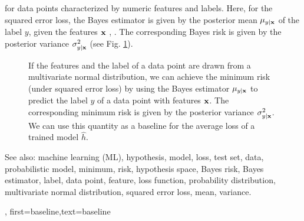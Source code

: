{{for data points characterized by numeric features and labels.
Here, for the squared error loss, the Bayes estimator is given by the posterior 
mean $\mu_{y|{\bf x}}$ of the label $y$, given the 
features ${\bf x}$ \cite{LC}, \cite{GrayProbBook}. The corresponding Bayes risk 
is given by the posterior variance 
$\sigma^{2}_{y|{\bf x}}$ (see Fig. \ref{fig_post_baseline_dict}).
	\begin{figure}[H]
		\begin{center}
		\end{center}
		\caption{If the features and the label of a data point are drawn from a multivariate normal distribution, we 
		can achieve the minimum risk (under squared error loss) by using the Bayes estimator $\mu_{y|{\bf x}}$ 
		to predict the label $y$ of a data point with features ${\bf x}$. The corresponding 
		minimum risk is given by the posterior variance $\sigma^{2}_{y|{\bf x}}$. We can use 
		this quantity as a baseline for the average loss of a trained model $\hat{h}$. \label{fig_post_baseline_dict}}
	\end{figure}
		See also: machine learning (ML), hypothesis, model, loss, test set, data, probabilistic model, minimum, risk, hypothesis space, Bayes risk, Bayes estimator, label, data point, feature, loss function, probability distribution, multivariate normal distribution, squared error loss, mean, variance.},
    first={baseline},text={baseline}
}

